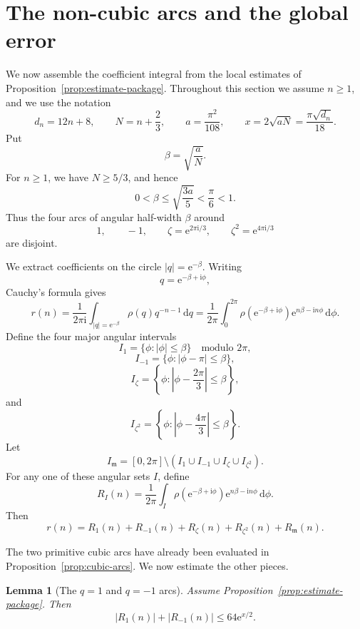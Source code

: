\documentclass[10pt,a4paper]{amsart}
\newtheorem{lemma}[theorem]{Lemma}
\newcommand{\ii}{\mathrm i}
\newcommand{\e}{\mathrm e}
\newcommand{\dd}{\mathrm d}
\newcommand{\mm}{\mathfrak m}
\begin{document}
\section{The non-cubic arcs and the global error}\label{sec:remaining-arcs}

We now assemble the coefficient integral from the local estimates of
Proposition~\ref{prop:estimate-package}.  Throughout this section we assume
$n\geq 1$, and we use the notation
\[
d_n=12n+8,\qquad
N=n+\frac23,\qquad
a=\frac{\pi^2}{108},
\qquad
x=2\sqrt{aN}=\frac{\pi\sqrt{d_n}}{18}.
\]
Put
\[
\beta=\sqrt{\frac{a}{N}}.
\]
For $n\geq1$, we have $N\geq5/3$, and hence
\[
0<\beta\leq\sqrt{\frac{3a}{5}}<\frac{\pi}{6}<1.
\]
Thus the four arcs of angular half-width $\beta$ around
\[
1,\qquad -1,\qquad \zeta=\e^{2\pi\ii/3},
\qquad \zeta^2=\e^{4\pi\ii/3}
\]
are disjoint.

We extract coefficients on the circle $|q|=\e^{-\beta}$.  Writing
\[
q=\e^{-\beta+\ii\phi},
\]
Cauchy's formula gives
\[
r(n)=\frac1{2\pi\ii}\int_{|q|=\e^{-\beta}}\rho(q)q^{-n-1}\,\dd q
=
\frac1{2\pi}\int_{0}^{2\pi}
\rho(\e^{-\beta+\ii\phi})\e^{n\beta-\ii n\phi}\,\dd\phi.
\]
Define the four major angular intervals
\[
I_1=\{\phi:|\phi|\leq\beta\}\quad \text{modulo }2\pi,
\]
\[
I_{-1}=\{\phi:|\phi-\pi|\leq\beta\},
\]
\[
I_\zeta=\left\{\phi:\left|\phi-\frac{2\pi}{3}\right|\leq\beta\right\},
\]
and
\[
I_{\zeta^2}=\left\{\phi:\left|\phi-\frac{4\pi}{3}\right|\leq\beta\right\}.
\]
Let
\[
I_{\mm}
=
[0,2\pi]\setminus
\left(I_1\cup I_{-1}\cup I_\zeta\cup I_{\zeta^2}\right).
\]
For any one of these angular sets $I$, define
\[
R_I(n)
=
\frac1{2\pi}
\int_I
\rho(\e^{-\beta+\ii\phi})\e^{n\beta-\ii n\phi}\,\dd\phi.
\]
Then
\begin{equation}\label{eq:arc-decomposition}
r(n)
=
R_1(n)+R_{-1}(n)+R_\zeta(n)+R_{\zeta^2}(n)+R_{\mm}(n).
\end{equation}

The two primitive cubic arcs have already been evaluated in
Proposition~\ref{prop:cubic-arcs}.  We now estimate the other pieces.

\begin{lemma}[The $q=1$ and $q=-1$ arcs]\label{lem:one-minusone-arcs}
Assume Proposition~\ref{prop:estimate-package}.  Then
\begin{equation}\label{eq:one-minusone-bound}
|R_1(n)|+|R_{-1}(n)|\leq64\e^{x/2}.
\end{equation}
\end{lemma}
\end{document}
